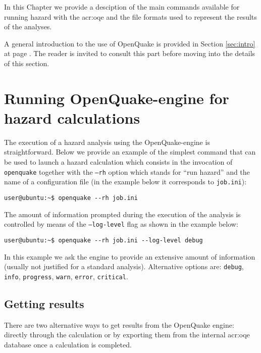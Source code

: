 In this Chapter we provide a desciption of the main commands available
for running hazard with the \gls{acr:oqe} and the file formats used to 
represent the results of the analyses.

A general introduction to the use of OpenQuake is provided in Section 
\ref{sec:intro} at page \pageref{sec:intro}.
The reader is invited to consult this part before moving into
the details of this section.
\section{Running OpenQuake-engine for hazard calculations}
The execution of a hazard analysis using the OpenQuake-engine 
is straightforward. Below we provide an example of the simplest 
command that can be used to launch a hazard calculation which 
consists in the invocation of \texttt{openquake} together with 
the \texttt{--rh} option which stands for ``run hazard'' and 
the name of a configuration file (in the example below
it corresponds to \texttt{job.ini}):
\begin{Verbatim}[frame=single, commandchars=\\\{\}, fontsize=\small]
user@ubuntu:~$ openquake --rh job.ini
\end{Verbatim}

The amount of information prompted during the execution of the 
analysis is controlled by means of the \texttt{--log-level} flag 
as shown in the example below:
\begin{Verbatim}[frame=single, commandchars=\\\{\}, fontsize=\small]
user@ubuntu:~$ openquake --rh job.ini --log-level debug
\end{Verbatim}
In this example we ask the engine to provide an extensive amount
of information (usually not justified for a standard analysis). 
Alternative options are: \texttt{debug}, \texttt{info}, \texttt{progress},
\texttt{warn}, \texttt{error}, \texttt{critical}.
\subsection{Getting results}
\label{sec:getting_results}
There are two alternative ways to get results from the OpenQuake engine:
directly through the calculation or by exporting them from the 
internal \gls{acr:oqe} database once a calculation is completed. 

